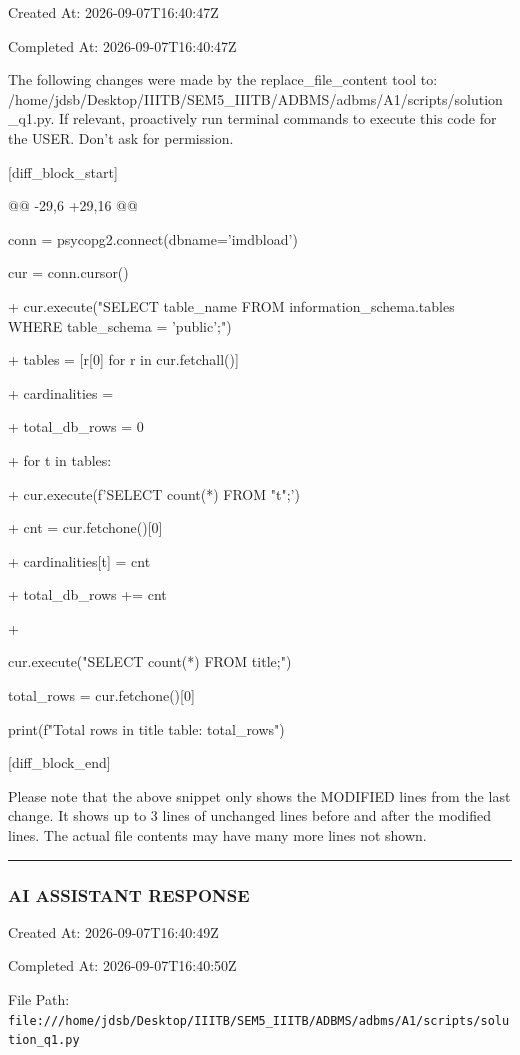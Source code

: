 \documentclass[11pt,a4paper]{article}
\begin{document}
Created At: 2026-09-07T16:40:47Z

Completed At: 2026-09-07T16:40:47Z

The following changes were made by the replace\_file\_content tool to: /home/jdsb/Desktop/IIITB/SEM5\_IIITB/ADBMS/adbms/A1/scripts/solution\_q1.py. If relevant, proactively run terminal commands to execute this code for the USER. Don't ask for permission.

[diff\_block\_start]

@@ -29,6 +29,16 @@

conn = psycopg2.connect(dbname='imdbload')

cur = conn.cursor()


+    cur.execute("SELECT table\_name FROM information\_schema.tables WHERE table\_schema = 'public';")

+    tables = [r[0] for r in cur.fetchall()]

+    cardinalities = {}

+    total\_db\_rows = 0

+    for t in tables:

+        cur.execute(f'SELECT count(*) FROM "{t}";')

+        cnt = cur.fetchone()[0]

+        cardinalities[t] = cnt

+        total\_db\_rows += cnt

+

cur.execute("SELECT count(*) FROM title;")

total\_rows = cur.fetchone()[0]

print(f"Total rows in title table: {total\_rows}")

[diff\_block\_end]


Please note that the above snippet only shows the MODIFIED lines from the last change. It shows up to 3 lines of unchanged lines before and after the modified lines. The actual file contents may have many more lines not shown.


\hrule

\subsubsection{AI ASSISTANT RESPONSE}

Created At: 2026-09-07T16:40:49Z

Completed At: 2026-09-07T16:40:50Z

File Path: \texttt{file:///home/jdsb/Desktop/IIITB/SEM5\_IIITB/ADBMS/adbms/A1/scripts/solution\_q1.py}
\end{document}
